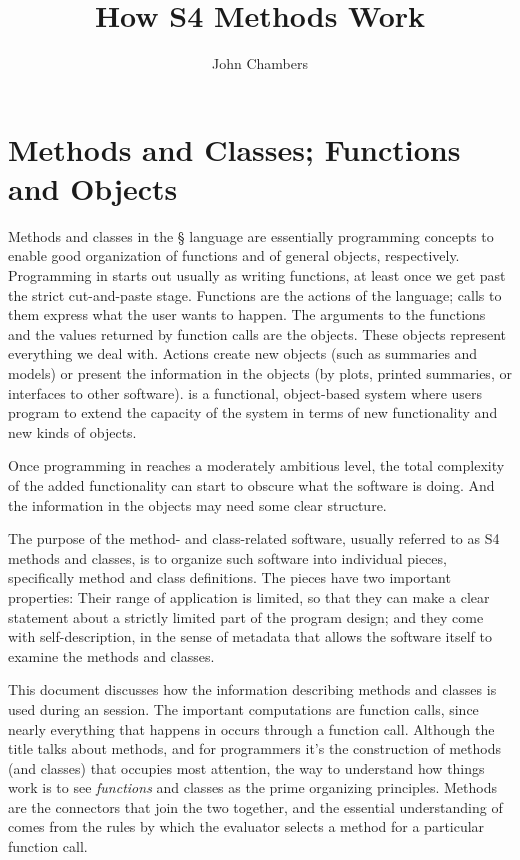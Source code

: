\documentclass[11pt]{article}
\title{How S4 Methods Work}
\author{John Chambers}
\newif\ifpdf
\begin{document}
\ifpdf
\DeclareGraphicsExtensions{.pdf, .jpg, .tif}
\else
{}
\fi

\maketitle

\section{Methods and Classes; Functions and Objects}
\label{sec:meth-clas-funct}

Methods and classes in the \S{} language are essentially programming concepts to enable good organization  of functions and of general objects, respectively.
Programming in \R{} starts out usually as writing functions, at least once we get past the strict cut-and-paste stage.
Functions are the actions of the language; calls to them express what the user wants to happen.
The arguments to the functions and the values returned by function calls are the objects.
These objects represent everything we deal with.
Actions create new objects (such as summaries and models) or present the information in the objects (by plots, printed summaries, or interfaces to other software).
\R{} is a functional, object-based system where users program to extend the capacity of the system in terms of new functionality and new kinds of objects.

Once programming in \R{} reaches a moderately ambitious level, the total complexity of the added functionality can start to obscure what the software is doing.
And the information in the objects may need some clear structure.

The purpose of the method- and class-related software, usually referred to as S4 methods and classes, is to organize such software into individual pieces, specifically method and class definitions.
The pieces have two important properties:  Their range of application is limited, so that they can make a clear statement about a strictly limited part of the program design; and they come with self-description, in the sense of metadata that allows the software itself to examine the methods and classes.

This document discusses how the information describing methods and classes is used during an \R{} session.
The important computations are function calls, since nearly everything that happens in \R{} occurs through a function call.
Although the title talks about methods, and for programmers it's the construction of methods (and classes) that occupies most attention, the way to understand how things work is to see \emph{functions} and classes as the prime organizing principles.
Methods are the connectors that join the two together, and the essential understanding of  comes from the rules by which the \R{} evaluator selects a method for a particular function call.
\end{document}
